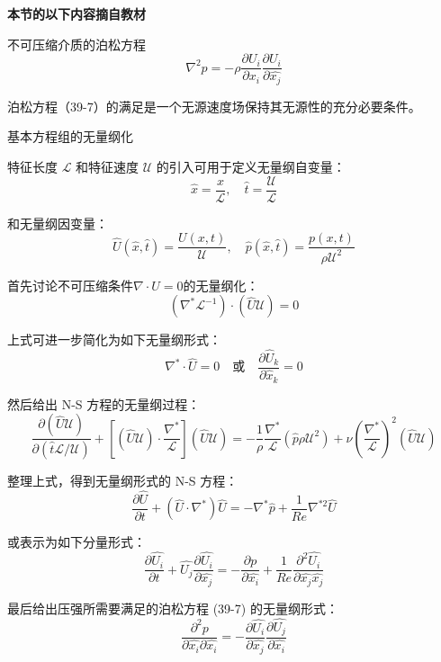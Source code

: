 \documentclass[12pt, a4paper, oneside, UTF8]{ctexbook}  %
\begin{document}
\begin{center}
    \textbf{本节的以下内容摘自教材}
\end{center}
\begin{defn}
    不可压缩介质的泊松方程
\[
\nabla^2 p = -\rho \frac{\partial U_i}{\partial x_i} \frac{\partial U_i}{\partial \hat{x_j}} \tag{39-7}
\]

泊松方程（39-7）的满足是一个无源速度场保持其无源性的充分必要条件。
\end{defn}
\begin{proposition}
    基本方程组的无量纲化

特征长度 \( \mathcal{L} \) 和特征速度 \( \mathcal{U} \) 的引入可用于定义无量纲自变量：
\[
\hat{x} = \frac{x}{\mathcal{L}}, \quad \hat{t} = \frac{\mathcal{U}}{\mathcal{L}} \tag{39-8}
\]

和无量纲因变量：
\[
\hat{U}(\hat{x}, \hat{t}) = \frac{U(x, t)}{\mathcal{U}}, \quad \hat{p}(\hat{x}, \hat{t}) = \frac{p(x, t)}{\rho \mathcal{U}^2} \tag{39-9}
\]

首先讨论不可压缩条件\(\nabla\cdot U=0\)的无量纲化：
\[
(\nabla^* \mathcal{L}^{-1}) \cdot (\hat{U} \mathcal{U}) = 0 \tag{39-10}
\]

上式可进一步简化为如下无量纲形式：
\[
\nabla^* \cdot \hat{U} = 0 \quad \text{或} \quad \frac{\partial \hat{U}_k}{\partial \hat{x}_k} = 0 \tag{39-11}
\]

然后给出 N-S 方程的无量纲过程：
\[
\frac{\partial (\hat{U} \mathcal{U})}{\partial (\hat{t} \mathcal{L} / \mathcal{U})} + \left[ (\hat{U} \mathcal{U}) \cdot \frac{\nabla^*}{\mathcal{L}} \right] (\hat{U} \mathcal{U}) = -\frac{1}{\rho} \frac{\nabla^*}{\mathcal{L}} (\hat{p} \rho \mathcal{U}^2) + \nu \left( \frac{\nabla^*}{\mathcal{L}} \right)^2 (\hat{U} \mathcal{U}) \tag{39-12}
\]

整理上式，得到无量纲形式的 N-S 方程：
\[
\frac{\partial \hat{U}}{\partial t} + \left( \hat{U} \cdot \nabla^* \right) \hat{U} = - \nabla^* \hat{p} + \frac{1}{Re} \nabla^{*2} \hat{U} \tag{39-13}
\]

或表示为如下分量形式：
\[
\frac{\partial \hat{U_i}}{\partial t} + \hat{U_j} \frac{\partial \hat{U_i}}{\partial \hat{x_j}} = -\frac{\partial p}{\partial \hat{x_i}} + \frac{1}{Re} \frac{\partial^2 \hat{U_i}}{\partial \hat{x_j} \hat{x_j}} \tag{39-14}
\]

最后给出压强所需要满足的泊松方程 (39-7) 的无量纲形式：
\[
\frac{\partial^2 p}{\partial \hat{x_i} \partial \hat{x_i}} = -\frac{\partial \hat{U_i}}{\partial \hat{x_j}} \frac{\partial \hat{U_j}}{\partial \hat{x_i}} \tag{39-15}
\]


\end{proposition}
\end{document}
